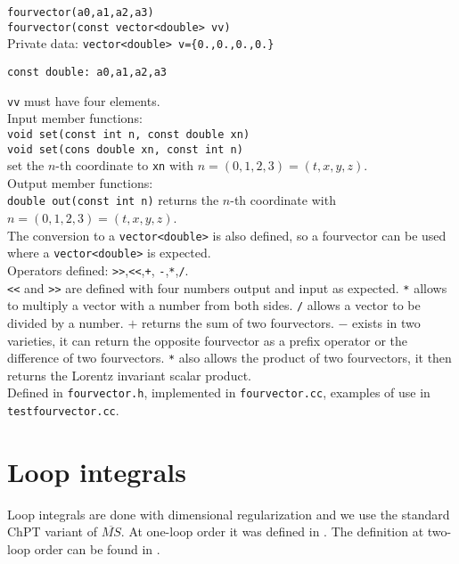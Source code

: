 \documentclass[12pt,a4paper]{article}
\newcommand{\mytt}[1]{\texttt{#1}}
\newcommand{\newfunction}[1]{\mytt{#1}\index{\mytt{#1}}}
\begin{document}
\mytt{fourvector(a0,a1,a2,a3)}\\
\mytt{fourvector(const vector<double> vv)}\\
Private data: \mytt{vector<double> v=\{0.,0.,0.,0.\}} 

\mytt{const double: a0,a1,a2,a3}

\mytt{vv} must have four elements.\\

Input member functions:\\
\mytt{void \newfunction{set}(const int n, const double xn)}\\
\mytt{void \newfunction{set}(cons double xn, const int n)}\\
 set the $n$-th coordinate to \mytt{xn} with $n= (0,1,2,3)=(t,x,y,z)$.\\

Output member functions:\\
\mytt{double \newfunction{out}(const int n)} returns the $n$-th coordinate
with $n= (0,1,2,3)=(t,x,y,z)$.\\
The conversion to a \mytt{vector<double>} is also defined, so
a fourvector can be used where a \mytt{vector<double>} is expected.\\

Operators defined: \newfunction{>>},\newfunction{<<},\newfunction{+},
 \newfunction{-},\newfunction{*},\newfunction{/}.\\
\mytt{<<} and \mytt{>>} are defined with four numbers output and input as
expected. \mytt{*} allows to multiply a vector with a number from both sides.
\mytt{/} allows a vector to be divided by a number. $+$ returns the sum of two
fourvectors. $-$ exists in two varieties, it can return the opposite fourvector
as a prefix operator or the difference of two fourvectors.
\mytt{*} also allows the product of two fourvectors, it then returns the
Lorentz invariant scalar product.\\

Defined in \mytt{fourvector.h}, implemented in \mytt{fourvector.cc},
examples of use in \mytt{testfourvector.cc}.

\section{Loop integrals}

Loop integrals are done with dimensional regularization and we use
the standard ChPT variant of $\overline{MS}$.
At one-loop order it was defined in \cite{Gasser:1983yg,Gasser:1984gg}.
The definition at two-loop order can be found in \cite{Bijnens:1999hw}.
\end{document}
